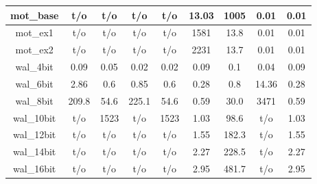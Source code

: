 \begin{table}[t]
\begin{tabular}{|c|c|c|c|c|c|c|c|c|}
mot\_base   & t/o       & t/o          & t/o        & t/o                  & 13.03     & 1005       & 0.01       & 0.01                 \\ \hline
mot\_ex1 & t/o       & t/o          & t/o        & t/o                  & 1581   & 13.8         & 0.01       & 0.01                 \\ \hline
mot\_ex2 & t/o       & t/o          & t/o        & t/o                  & 2231   & 13.7         & 0.01       & 0.01                 \\ \hline \hline
wal\_4bit  & 0.09      & 0.05         & 0.02       & 0.02                 & 0.09      & 0.1          & 0.04       & 0.09                 \\ \hline
wal\_6bit  & 2.86      & 0.6          & 0.85       & 0.6                  & 0.28      & 0.8          & 14.36      & 0.28                 \\ \hline
wal\_8bit  & 209.8    & 54.6         & 225.1     & 54.6                 & 0.59      & 30.0         & 3471    & 0.59                 \\ \hline
wal\_10bit & t/o       & 1523       & t/o        & 1523               & 1.03      & 98.6         & t/o        & 1.03                 \\ \hline
wal\_12bit & t/o       & t/o          & t/o        & t/o                  & 1.55      & 182.3        & t/o        & 1.55                 \\ \hline
wal\_14bit & t/o       & t/o          & t/o        & t/o                  & 2.27      & 228.5        & t/o        & 2.27                 \\ \hline
wal\_16bit & t/o       & t/o          & t/o        & t/o                  & 2.95      & 481.7        & t/o        & 2.95                 \\ \hline

\end{tabular}
\end{table} 

